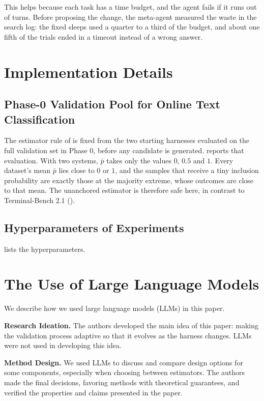 \documentclass{article} %
\begin{document}
This helps because each task has a time budget, and the agent fails if it runs out
of turns. Before proposing the change, the meta-agent measured the waste in the
search log: the fixed sleeps used a quarter to a third of the budget, and about one
fifth of the trials ended in a timeout instead of a wrong answer.

\section{Implementation Details}
\label{app:implementation}

\subsection{Phase-0 Validation Pool for Online Text Classification}
\label{app:tc_phase0}
The estimator rule of  is fixed from the two
starting harnesses evaluated on the full validation set in Phase 0, before any
candidate is generated.  reports that evaluation. With two
systems, $\bar{p}$ takes only the values $0$, $0.5$ and $1$. Every dataset's mean
$\bar{p}$ lies close to $0$ or $1$, and the samples that receive a tiny inclusion
probability are exactly those at the majority extreme, whose outcomes are close to
that mean. The unanchored estimator is therefore safe here, in contrast to
Terminal-Bench 2.1 ().



\subsection{Hyperparameters of Experiments}
\label{app:vws_hparams}

 lists the hyperparameters.




\section{The Use of Large Language Models}
\label{app:llm_usage}

We describe how we used large language models (LLMs) in this paper.

\textbf{Research Ideation.} The authors developed the main idea of this paper: making the validation process adaptive so that it evolves as the harness changes. LLMs were not used in developing this idea.

\textbf{Method Design.} We used LLMs to discuss and compare design options for some components, especially when choosing between estimators. The authors made the final decisions, favoring methods with theoretical guarantees, and verified the properties and claims presented in the paper.
\end{document}

